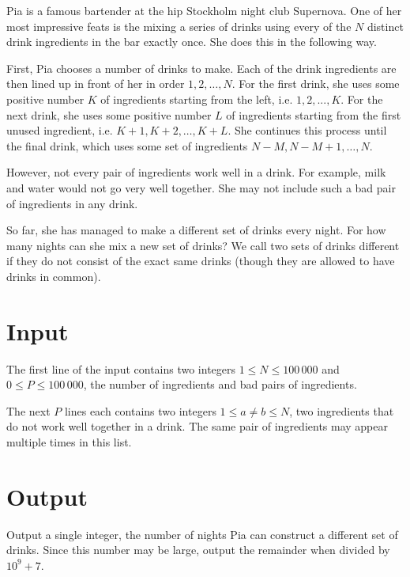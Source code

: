 Pia is a famous bartender at the hip Stockholm night club Supernova.
One of her most impressive feats is the mixing a series of drinks using every of the $N$ distinct drink ingredients in the bar exactly once.
She does this in the following way.

First, Pia chooses a number of drinks to make.
Each of the drink ingredients are then lined up in front of her in order $1, 2, \dots, N$.
For the first drink, she uses some positive number $K$ of ingredients starting from the left, i.e. $1, 2, ..., K$.
For the next drink, she uses some positive number $L$ of ingredients starting from the first unused ingredient, i.e. $K + 1, K + 2, \dots, K + L$.
She continues this process until the final drink, which uses some set of ingredients $N - M, N - M + 1, \dots, N$.

However, not every pair of ingredients work well in a drink.
For example, milk and water would not go very well together.
She may not include such a bad pair of ingredients in any drink.

So far, she has managed to make a different set of drinks every night.
For how many nights can she mix a new set of drinks?
We call two sets of drinks different if they do not consist of the exact same drinks (though they are allowed to have drinks in common).

\section*{Input}
The first line of the input contains two integers $1 \le N \le 100\,000$ and $0 \le P \le 100\,000$, the number of ingredients and bad pairs of ingredients.

The next $P$ lines each contains two integers $1 \le a \not= b \le N$, two ingredients that do not work well together in a drink.
The same pair of ingredients may appear multiple times in this list.

\section*{Output}
Output a single integer, the number of nights Pia can construct a different set of drinks.
Since this number may be large, output the remainder when divided by $10^9 + 7$.
